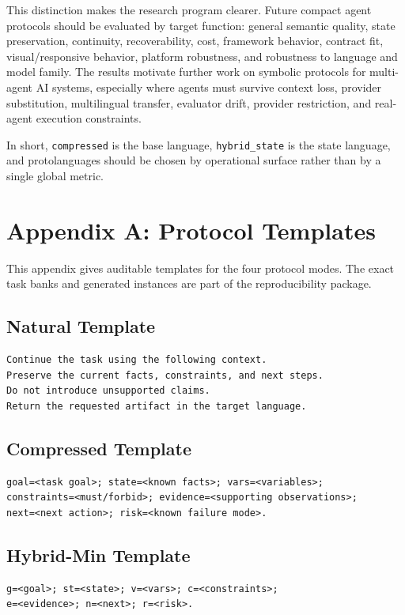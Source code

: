 \documentclass[11pt]{article}
\begin{document}
This distinction makes the research program clearer. Future compact agent protocols should be evaluated by target function: general semantic quality, state preservation, continuity, recoverability, cost, framework behavior, contract fit, visual/responsive behavior, platform robustness, and robustness to language and model family. The results motivate further work on symbolic protocols for multi-agent AI systems, especially where agents must survive context loss, provider substitution, multilingual transfer, evaluator drift, provider restriction, and real-agent execution constraints.

In short, \texttt{compressed} is the base language, \texttt{hybrid\_state} is the state language, and protolanguages should be chosen by operational surface rather than by a single global metric.


\appendix
\section{Appendix A: Protocol Templates}
\label{app:protocol_templates}
This appendix gives auditable templates for the four protocol modes. The exact task banks and generated instances are part of the reproducibility package.

\subsection{Natural Template}
\begin{verbatim}
Continue the task using the following context.
Preserve the current facts, constraints, and next steps.
Do not introduce unsupported claims.
Return the requested artifact in the target language.
\end{verbatim}

\subsection{Compressed Template}
\begin{verbatim}
goal=<task goal>; state=<known facts>; vars=<variables>;
constraints=<must/forbid>; evidence=<supporting observations>;
next=<next action>; risk=<known failure mode>.
\end{verbatim}

\subsection{Hybrid-Min Template}
\begin{verbatim}
g=<goal>; st=<state>; v=<vars>; c=<constraints>;
e=<evidence>; n=<next>; r=<risk>.
\end{verbatim}
\end{document}
